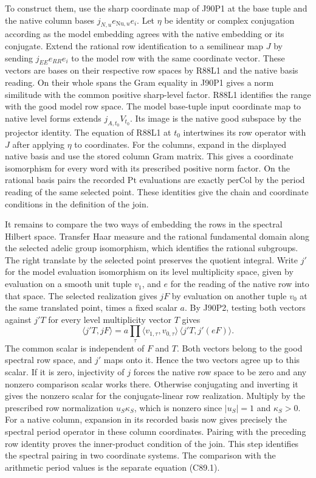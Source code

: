 To construct them, use the sharp coordinate map of J90P1 at the
base tuple and the native column bases $j_{N,u}e_{\mathrm{Nu},u}e_i$.
Let $\eta$ be identity or complex conjugation according as the
model embedding agrees with the native embedding or its conjugate.
Extend the rational row identification to a semilinear map $J$
by sending $j_{EE}e_{RR}e_i$ to the model row with the same
coordinate vector. These vectors are bases on their respective
row spaces by R88L1 and the native basis reading. On their whole
spans the Gram equality in J90P1 gives a norm similitude with
the common positive sharp-level factor. R88L1 identifies the
range with the good model row space. The model base-tuple input
coordinate map to native level forms extends $j_{A,t_0}V_{t_0}$.
Its image is the native good subspace by the projector identity.
The equation of R88L1 at $t_0$ intertwines its row operator with
$J$ after applying $\eta$ to coordinates. For the columns,
expand in the displayed native basis and use the stored column
Gram matrix. This gives a coordinate isomorphism for every word
with its prescribed positive norm factor. On the rational basis
pairs the recorded $\mathrm{Pt}$ evaluations are exactly
$\mathrm{perCol}$ by the period reading of the same selected
point. These identities give the chain and coordinate conditions
in the definition of the join.

It remains to compare the two ways of embedding the rows in the
spectral Hilbert space. Transfer Haar measure and the rational fundamental
domain along the selected adelic group isomorphism, which identifies
the rational subgroups. The right translate by the selected point
preserves the quotient integral. Write $j'$ for the model evaluation
isomorphism on its level multiplicity space, given by evaluation
on a smooth unit tuple $v_1$, and $e$ for the reading of the
native row into that space. The selected realization gives $jF$
by evaluation on another tuple $v_0$ at the same translated
point, times a fixed scalar $a$. By J90P2, testing both vectors
against $j'T$ for every level multiplicity vector $T$ gives
\[
 \langle j'T,jF\rangle
   =a\!\prod_\tau\langle v_{1,\tau},v_{0,\tau}\rangle\,
                         \langle j'T,j'(eF)\rangle .
\]
The common scalar is independent of $F$ and $T$. Both vectors
belong to the good spectral row space, and $j'$ maps onto it. Hence the two vectors agree up to this scalar. If it is zero,
injectivity of $j$ forces the native row space to be zero and any
nonzero comparison scalar works there. Otherwise conjugating and
inverting it gives the nonzero scalar for the conjugate-linear
row realization. Multiply by the prescribed row normalization
$u_S\kappa_S$, which is nonzero since $|u_S|=1$ and
$\kappa_S>0$. For a native column, expansion in its recorded basis
now gives precisely the spectral period operator in these column
coordinates. Pairing with the preceding row identity proves the
inner-product condition of the join. This step identifies the
spectral pairing in two coordinate systems. The comparison with
the arithmetic period values is the separate equation (C89.1).

